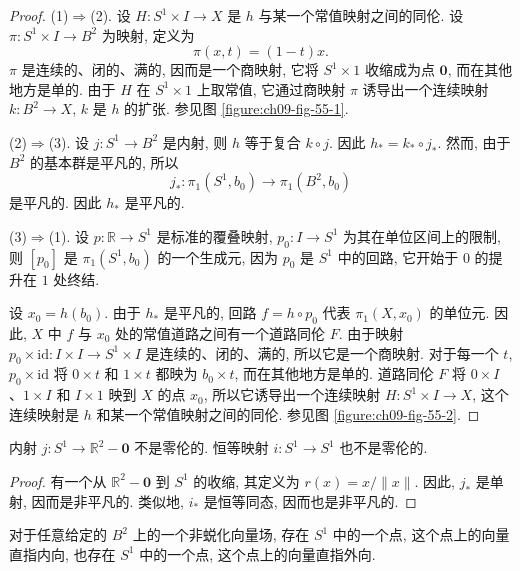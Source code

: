 \begin{proof}
(1)$\Rightarrow$(2). 设 $H\colon S^{1}\times I\to X$ 是 $h$ 与某一个常值映射之间的同伦. 设 $\pi\colon S^{1}\times I\to B^{2}$ 为映射, 定义为
\[
\pi(x,t)=(1-t)x.
\]
$\pi$ 是连续的、闭的、满的, 因而是一个商映射, 它将 $S^{1}\times 1$ 收缩成为点 $\boldsymbol{0}$, 而在其他地方是单的. 由于 $H$ 在 $S^{1}\times 1$ 上取常值, 它通过商映射 $\pi$ 诱导出一个连续映射 $k\colon B^{2}\to X$, $k$ 是 $h$ 的扩张. 参见图 \cref{figure:ch09-fig-55-1}.


(2)$\Rightarrow$(3). 设 $j\colon S^{1}\to B^{2}$ 是内射, 则 $h$ 等于复合 $k\circ j$. 因此 $h_*=k_*\circ j_*$. 然而, 由于 $B^{2}$ 的基本群是平凡的, 所以
\[
j_{*}\colon\pi_{1}(S^{1},b_{0})\longrightarrow\pi_{1}(B^{2},b_{0})
\]
是平凡的. 因此 $h_*$ 是平凡的.

(3)$\Rightarrow$(1). 设 $p\colon\mathbb{R}\to S^{1}$ 是标准的覆叠映射, $p_0\colon I\to S^{1}$ 为其在单位区间上的限制, 则 $[p_0]$ 是 $\pi_1(S^{1},b_0)$ 的一个生成元, 因为 $p_0$ 是 $S^{1}$ 中的回路, 它开始于 $0$ 的提升在 $1$ 处终结.

设 $x_0=h(b_0)$. 由于 $h_*$ 是平凡的, 回路 $f=h\circ p_0$ 代表 $\pi_1(X,x_0)$ 的单位元. 因此, $X$ 中 $f$ 与 $x_0$ 处的常值道路之间有一个道路同伦 $F$. 由于映射 $p_0\times\mathrm{id}\colon I\times I\to S^{1}\times I$ 是连续的、闭的、满的, 所以它是一个商映射. 对于每一个 $t$, $p_0\times\mathrm{id}$ 将 $0\times t$ 和 $1\times t$ 都映为 $b_0\times t$, 而在其他地方是单的. 道路同伦 $F$ 将 $0\times I$、$1\times I$ 和 $I\times 1$ 映到 $X$ 的点 $x_0$, 所以它诱导出一个连续映射 $H\colon S^{1}\times I\to X$, 这个连续映射是 $h$ 和某一个常值映射之间的同伦. 参见图 \cref{figure:ch09-fig-55-2}.
\end{proof}


\begin{corollary}
\label{corollary:ch09-sec55-55-4}
内射 $j\colon S^{1}\to\mathbb{R}^{2}-\boldsymbol{0}$ 不是零伦的. 恒等映射 $i\colon S^{1}\to S^{1}$ 也不是零伦的.
\end{corollary}

\begin{proof}
有一个从 $\mathbb{R}^{2}-\boldsymbol{0}$ 到 $S^{1}$ 的收缩, 其定义为 $r(x)=x/\|x\|$. 因此, $j_*$ 是单射, 因而是非平凡的. 类似地, $i_*$ 是恒等同态, 因而也是非平凡的.
\end{proof}

\begin{theorem}
\label{theorem:ch09-sec55-55-5}
对于任意给定的 $B^{2}$ 上的一个非蜕化向量场, 存在 $S^{1}$ 中的一个点, 这个点上的向量直指内向, 也存在 $S^{1}$ 中的一个点, 这个点上的向量直指外向.
\end{theorem}

